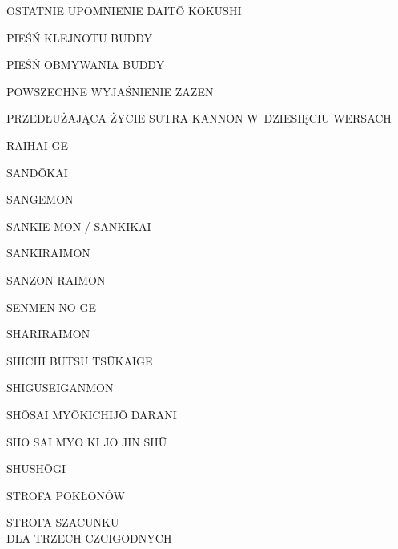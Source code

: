 \par\noindent OSTATNIE UPOMNIENIE DAIT\=O KOKUSHI \dotfill \makebox[1.0cm][r]{\pageref{ostatnie_upomnienie}}
\par\noindent PIEŚŃ KLEJNOTU BUDDY \dotfill \makebox[1.0cm][r]{\pageref{piesn_klejnotu_buddy}}
\par\noindent PIEŚŃ OBMYWANIA BUDDY \dotfill \makebox[1.0cm][r]{\pageref{piesn_obmywania_buddy}}
\par\noindent POWSZECHNE WYJAŚNIENIE ZAZEN \dotfill \makebox[1.0cm][r]{\pageref{ogolne_zalecenia}}
\par\noindent PRZEDŁUŻAJĄCA ŻYCIE SUTRA KANNON W~DZIESIĘCIU WERSACH \dotfill \makebox[1.0cm][r]{\pageref{sutra_kannon}}
\par\noindent RAIHAI GE \dotfill \makebox[1.0cm][r]{\pageref{raihaige}}
\par\noindent SAND\=OKAI \dotfill \makebox[1.0cm][r]{\pageref{sandokai}}
\par\noindent SANGEMON \dotfill \makebox[1.0cm][r]{\pageref{sangemon}}
\par\noindent SANKIE MON / SANKIKAI \dotfill \makebox[1.0cm][r]{\pageref{sankiemon}}
\par\noindent SANKIRAIMON \dotfill \makebox[1.0cm][r]{\pageref{sankiraimon}}
\par\noindent SANZON RAIMON \dotfill \makebox[1.0cm][r]{\pageref{sanzonraimon}}
\par\noindent SENMEN NO GE \dotfill \makebox[1.0cm][r]{\pageref{senmen_no_ge}}
\par\noindent SHARIRAIMON \dotfill \makebox[1.0cm][r]{\pageref{shariraimon}}
\par\noindent SHICHI BUTSU TS\=UKAIGE \dotfill \makebox[1.0cm][r]{\pageref{shichi_butsu_tsukaige}}
\par\noindent SHIGUSEIGANMON \dotfill \makebox[1.0cm][r]{\pageref{shiguseiganmon}}
\par\noindent SH\=OSAI MY\=OKICHIJ\=O DARANI \dotfill \makebox[1.0cm][r]{\pageref{sio_saj_mio}}
\par\noindent SHO SAI MYO KI J\=O JIN SH\=U \dotfill \makebox[1.0cm][r]{\pageref{sho_sai_myo_ki_jo}}
\par\noindent SHUSH\=OGI \dotfill \makebox[1.0cm][r]{\pageref{shushogi}}
\par\noindent STROFA POKŁONÓW \dotfill \makebox[1.0cm][r]{\pageref{strofa_poklonow}}
\par\noindent STROFA SZACUNKU\\ DLA TRZECH CZCIGODNYCH \dotfill \makebox[1.0cm][r]{\pageref{strofa_szacunku}}
